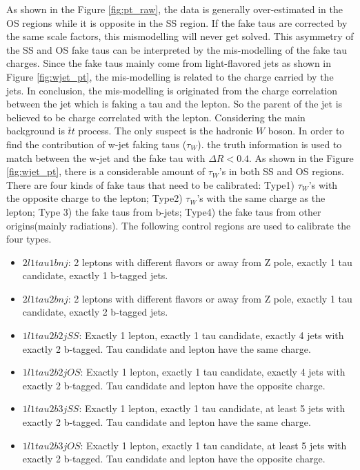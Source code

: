 As shown in the Figure \ref{fig:pt_raw}, the data is generally over-estimated in the OS regions while it is opposite in the SS region. If the fake taus are corrected by the same scale factors, this mismodelling will never get solved. This asymmetry of the SS and OS fake taus can be interpreted by the mis-modelling of the fake tau charges. Since the fake taus mainly come from light-flavored jets as shown in Figure \ref{fig:wjet_pt}, the mis-modelling is related to the charge carried by the jets. In conclusion, the mis-modelling is originated from the charge correlation between the jet which is faking a tau and the lepton. So the parent of the jet is believed to be charge correlated with the lepton. Considering the main background is $\bar{t}t$ process. The only suspect is the hadronic $W$ boson. In order to find the contribution of w-jet faking taus ($\tau_{W}$).  the truth information is used to match between the w-jet and the fake tau with $\Delta R < 0.4$. As shown in the Figure \ref{fig:wjet_pt}, there is a considerable amount of $\tau_{W}$'s in both SS and OS regions. There are four kinds of fake taus that need to be calibrated: Type1) $\tau_{W}$'s with the opposite charge to the lepton; Type2) $\tau_{W}$'s with the same charge as the lepton; Type 3) the fake taus from b-jets; Type4) the fake taus from other origins(mainly radiations). The following control regions are used to calibrate the four types.


\begin{itemize}
\item{$2l1tau1bnj$: 2 leptons with different flavors or away from Z pole, exactly 1 tau candidate,  exactly 1 b-tagged jets.}
\item{$2l1tau2bnj$: 2 leptons with different flavors or away from Z pole, exactly 1 tau candidate,  exactly 2 b-tagged jets.}
\item{$1l1tau2b2j SS$: Exactly 1 lepton, exactly 1 tau candidate, exactly 4 jets with exactly 2 b-tagged. Tau candidate and lepton have the same charge.}
\item{$1l1tau2b2j OS$: Exactly 1 lepton, exactly 1 tau candidate, exactly 4 jets with exactly 2 b-tagged. Tau candidate and lepton have the opposite charge.}
\item{$1l1tau2b3j SS$: Exactly 1 lepton, exactly 1 tau candidate, at least 5 jets with exactly 2 b-tagged. Tau candidate and lepton have the same charge.}
\item{$1l1tau2b3j OS$: Exactly 1 lepton, exactly 1 tau candidate, at least 5 jets with exactly 2 b-tagged. Tau candidate and lepton have the opposite charge.}
\end{itemize}

